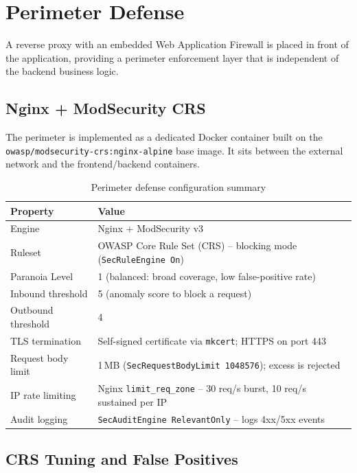 \documentclass[12pt,a4paper]{report}
\begin{document}
\section{Perimeter Defense}

A reverse proxy with an embedded Web Application Firewall is placed in front of the
application, providing a perimeter enforcement layer that is independent of the backend
business logic.

\subsection{Nginx + ModSecurity CRS}

The perimeter is implemented as a dedicated Docker container built on the
\texttt{owasp/modsecurity-crs:nginx-alpine} base image. It sits between the external
network and the frontend/backend containers.

\begin{table}[H]
\centering
\caption{Perimeter defense configuration summary}
\begin{tabularx}{\linewidth}{l X}
\toprule
\textbf{Property} & \textbf{Value} \\
\midrule
Engine              & Nginx + ModSecurity v3 \\
Ruleset             & OWASP Core Rule Set (CRS) -- blocking mode (\texttt{SecRuleEngine On}) \\
Paranoia Level      & 1 (balanced: broad coverage, low false-positive rate) \\
Inbound threshold   & 5 (anomaly score to block a request) \\
Outbound threshold  & 4 \\
TLS termination     & Self-signed certificate via \texttt{mkcert}; HTTPS on port 443 \\
Request body limit  & 1\,MB (\texttt{SecRequestBodyLimit 1048576}); excess is rejected \\
IP rate limiting    & Nginx \texttt{limit\_req\_zone} -- 30 req/s burst, 10 req/s sustained per IP \\
Audit logging       & \texttt{SecAuditEngine RelevantOnly} -- logs 4xx/5xx events \\
\bottomrule
\end{tabularx}
\end{table}

\subsection{CRS Tuning and False Positives}
\end{document}
